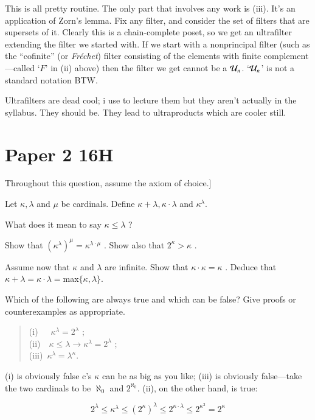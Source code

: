\documentclass{book}
\begin{document}
\medskip

This is all pretty routine. The only part that involves any work is
(iii). It's an application of Zorn's lemma.  Fix any filter, and
consider the set of filters that are supersets of it.  Clearly this is
a chain-complete poset, so we get an ultrafilter extending the filter
we started with.  If we start with a nonprincipal filter (such as the
``cofinite'' (or {\sl Fr\'echet}) filter consisting of the elements
with finite complement---called `$F$' in (ii) above) then the filter
we get cannot be a ${\cal U}_n$. `${\cal U}_n$' is not a standard notation BTW.

Ultrafilters are dead cool; i use to lecture them but they aren't
actually in the syllabus.  They should be. They lead to ultraproducts
which are cooler still.

\section{Paper 2 16H}

Throughout this question, assume the axiom of choice.]

  Let $\kappa, \lambda$ and $\mu$ be cardinals.  Define $\kappa +\lambda, \kappa\cdot \lambda$ and $\kappa^\lambda$.

  What does it mean to say $\kappa \leq \lambda$ ?

  Show that $(\kappa^\lambda)^\mu =\kappa^{ \lambda \cdot\mu}$ .
  Show also that $2^\kappa > \kappa$ .

  Assume  now  that $\kappa$ and $\lambda$ are  infinite.
  Show  that $\kappa\cdot \kappa =\kappa$ .   Deduce  that
  $\kappa +\lambda =\kappa\cdot\lambda =$max$\{\kappa ,\lambda \}$.
  
  Which of the following are always true and which can be false?
  Give  proofs  or counterexamples as appropriate.
\begin{quote}
  (i)\ \ \ $\kappa^\lambda = 2^\lambda$ ;\\
  (ii)\ \ $\kappa \leq \lambda \to \kappa^\lambda = 2^\lambda$ ;\\
  (iii)\ $\kappa^\lambda =\lambda^\kappa$.\end{quote}

  (i) is obviously false c's $\kappa$ can be as big as you like;
  (iii) is obviously false---take the two cardinals to be $\aleph_0$ and $2^{\aleph_0}$. (ii), on the other hand, is true:

  $$2^\lambda \leq \kappa^\lambda \leq (2^\kappa)^\lambda \leq 2^{\kappa\cdot \lambda} \leq 2^{\kappa^2} = 2^\kappa$$
\end{document}

